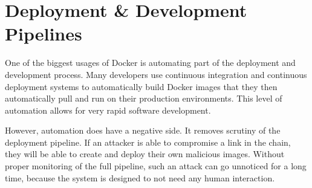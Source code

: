 \section{Deployment \& Development Pipelines}
One of the biggest usages of Docker is automating part of the deployment and development process. Many developers use continuous integration and continuous deployment systems to automatically build Docker images that they then automatically pull and run on their production environments. This level of automation allows for very rapid software development.

However, automation does have a negative side. It removes scrutiny of the deployment pipeline. If an attacker is able to compromise a link in the chain, they will be able to create and deploy their own malicious images. Without proper monitoring of the full pipeline, such an attack can go unnoticed for a long time, because the system is designed to not need any human interaction.

